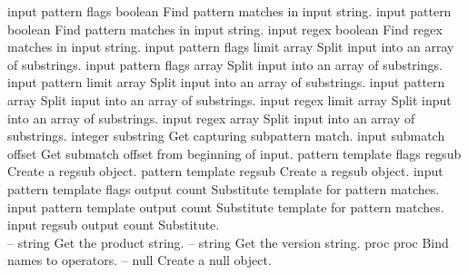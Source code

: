 \begin{longtable}{}
\hline
\optableent
	{input pattern flags}
	{{\bf {}}}
	{boolean}
	{Find pattern matches in input string.}
\optableent
	{input pattern}
	{{\bf {}}}
	{boolean}
	{Find pattern matches in input string.}
\optableent
	{input regex}
	{{\bf {}}}
	{boolean}
	{Find regex matches in input string.}
\hline
\optableent
	{input pattern flags limit}
	{{\bf {}}}
	{array}
	{Split input into an array of substrings.}
\optableent
	{input pattern flags}
	{{\bf {}}}
	{array}
	{Split input into an array of substrings.}
\optableent
	{input pattern limit}
	{{\bf {}}}
	{array}
	{Split input into an array of substrings.}
\optableent
	{input pattern}
	{{\bf {}}}
	{array}
	{Split input into an array of substrings.}
\optableent
	{input regex limit}
	{{\bf {}}}
	{array}
	{Split input into an array of substrings.}
\optableent
	{input regex}
	{{\bf {}}}
	{array}
	{Split input into an array of substrings.}
\hline
\optableent
	{integer}
	{{\bf {}}}
	{substring}
	{Get capturing subpattern match.}
\hline
\optableent
	{input submatch}
	{{\bf {}}}
	{offset}
	{Get submatch offset from beginning of input.}
\hline
\optableent
	{pattern template flags}
	{{\bf {}}}
	{regsub}
	{Create a regsub object.}
\optableent
	{pattern template}
	{{\bf {}}}
	{regsub}
	{Create a regsub object.}
\hline
\optableent
	{input pattern template flags}
	{{\bf {}}}
	{output count}
	{Substitute template for pattern matches.}
\optableent
	{input pattern template}
	{{\bf {}}}
	{output count}
	{Substitute template for pattern matches.}
\optableent
	{input regsub}
	{{\bf {}}}
	{output count}
	{Substitute.}
\hline \hline
{} \\
\hline \hline
\optableent
	{--}
	{{\bf {}}}
	{string}
	{Get the product string.}
\hline
\optableent
	{--}
	{{\bf {}}}
	{string}
	{Get the version string.}
\hline
\optableent
	{proc}
	{{\bf {}}}
	{proc}
	{Bind names to operators.}
\hline
\optableent
	{--}
	{{\bf {}}}
	{null}
	{Create a null object.}
\end{longtable}

